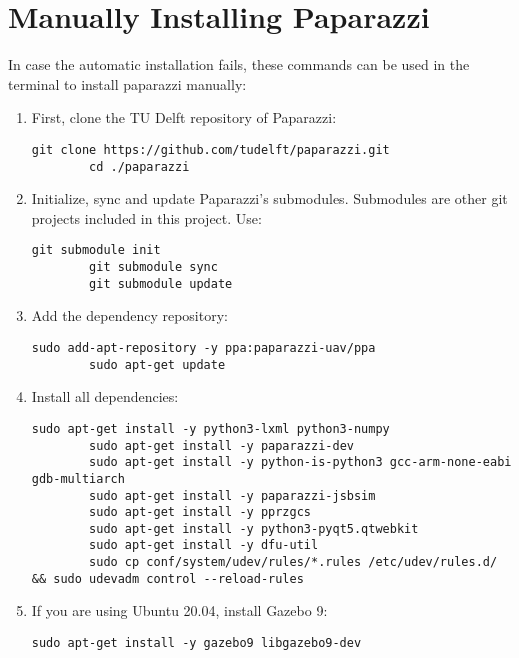 \chapter{Manually Installing Paparazzi}\label{manual_install}

In case the automatic installation fails, these commands can be used in the terminal to install paparazzi manually:


\begin{enumerate}
	\item First, clone the TU Delft repository of Paparazzi:

	\begin{lstlisting}[style=Bash]
		git clone https://github.com/tudelft/paparazzi.git
		cd ./paparazzi
	\end{lstlisting}

    \item Initialize, sync and update Paparazzi's submodules. Submodules are other git projects included in this project. Use:
    \begin{lstlisting}[style=Bash]
        git submodule init
        git submodule sync
        git submodule update
    \end{lstlisting}

    \item Add the dependency repository:
    \begin{lstlisting}[style=Bash]
        sudo add-apt-repository -y ppa:paparazzi-uav/ppa
        sudo apt-get update
    \end{lstlisting}

    \item Install all dependencies:
    \begin{lstlisting}[style=Bash]
        sudo apt-get install -y python3-lxml python3-numpy
        sudo apt-get install -y paparazzi-dev
        sudo apt-get install -y python-is-python3 gcc-arm-none-eabi gdb-multiarch
        sudo apt-get install -y paparazzi-jsbsim
        sudo apt-get install -y pprzgcs
        sudo apt-get install -y python3-pyqt5.qtwebkit
        sudo apt-get install -y dfu-util
        sudo cp conf/system/udev/rules/*.rules /etc/udev/rules.d/ && sudo udevadm control --reload-rules
    \end{lstlisting}

    \item If you are using Ubuntu 20.04, install Gazebo 9:
    \begin{lstlisting}[style=Bash]
        sudo apt-get install -y gazebo9 libgazebo9-dev
    \end{lstlisting}


\end{enumerate}
